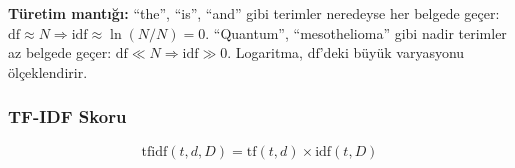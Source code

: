 \noindent
\textbf{T\"{u}retim mant{\i}\u{g}{\i}:} ``the'', ``is'', ``and'' gibi terimler neredeyse her belgede ge\c{c}er: $\text{df} \approx N \Rightarrow \text{idf} \approx \ln(N/N) = 0$. ``Quantum'', ``mesothelioma'' gibi nadir terimler az belgede ge\c{c}er: $\text{df} \ll N \Rightarrow \text{idf} \gg 0$. Logaritma, $\text{df}$'deki b\"{u}y\"{u}k varyasyonu \"{o}l\c{c}eklendirir.

\subsubsection{TF-IDF Skoru}

\begin{equation}
\text{tfidf}(t, d, D) = \text{tf}(t, d) \times \text{idf}(t, D)
\label{eq:tfidf}
\end{equation}

